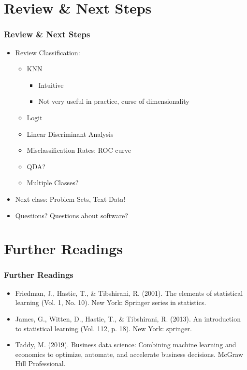 \documentclass[
  shownotes,
  xcolor={svgnames},
  hyperref={colorlinks,citecolor=DarkBlue,linkcolor=DarkRed,urlcolor=DarkBlue}
  , aspectratio=169]{beamer}
\begin{document}
\section{Review
 \& Next Steps}
\begin{frame}
\frametitle{Review \& Next Steps}
  
\begin{itemize} 
    \item Review Classification:
    \medskip
    \begin{itemize} 
      \item KNN
        \begin{itemize}  
            \item Intuitive
            \item Not very useful in practice, curse of dimensionality
        \end{itemize}      
     \medskip   
    \item Logit
    \medskip
  \item Linear Discriminant Analysis
  \medskip
  \item  Misclassification Rates: ROC curve
  \medskip
  \item QDA?
  \medskip 
  \item Multiple Classes?

    \end{itemize}
    \bigskip  
  \item  Next class:  Problem Sets, Text Data!


\bigskip  
\item Questions? Questions about software? 

\end{itemize}
\end{frame}
\section{Further Readings}
\begin{frame}
\frametitle{Further Readings}

\begin{itemize}


  \item Friedman, J., Hastie, T., \& Tibshirani, R. (2001). The elements of statistical learning (Vol. 1, No. 10). New York: Springer series in statistics.
  \medskip
  \item James, G., Witten, D., Hastie, T., \& Tibshirani, R. (2013). An introduction to statistical learning (Vol. 112, p. 18). New York: springer.
  \medskip
  \item Taddy, M. (2019). Business data science: Combining machine learning and economics to optimize, automate, and accelerate business decisions. McGraw Hill Professional.
  
  
\end{itemize}

\end{frame}






\end{document}
